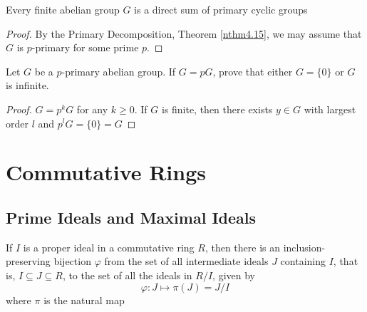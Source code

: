 \documentclass[11pt]{article}
\begin{document}
\begin{theorem}
Every finite abelian group \(G\)  is a direct sum of primary cyclic groups
\end{theorem}

\begin{proof}
By the Primary Decomposition, Theorem \ref{nthm4.15}, we may assume that \(G\)
is \(p\)-primary for some prime \(p\).
\end{proof}

\begin{exercise}
\label{nex4.3}
Let \(G\) be a \(p\)-primary abelian group. If \(G=pG\), prove that either
\(G=\{0\}\) or \(G\) is infinite.
\end{exercise}

\begin{proof}
\(G=p^kG\) for any \(k\ge 0\). If \(G\) is finite, then there exists 
\(y\in G\) with largest order \(l\) and \(p^lG=\{0\}=G\)
\end{proof}
\section{Commutative Rings }
\label{sec:org8d16a01}
\subsection{Prime Ideals and Maximal Ideals}
\label{sec:org3ec3830}
\begin{proposition}
If \(I\) is a proper ideal in a commutative ring \(R\), then there is an
inclusion-preserving bijection \(\varphi\) from the set of all intermediate ideals \(J\)
containing \(I\), that is, \(I\subseteq J\subseteq R\), to the set of all the
ideals in \(R/I\), given by
\begin{equation*}
\varphi:J\mapsto\pi(J)=J/I
\end{equation*}
where \(\pi\) is the natural map
\begin{center}
\end{center}
\end{proposition}
\end{document}
